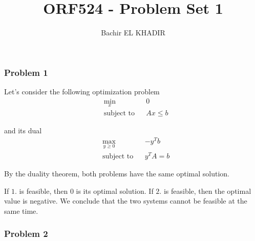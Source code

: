 \documentclass[12pt]{article}
\title{ORF524 - Problem Set 1}
\author{Bachir EL KHADIR }
\newcommand{\Q}[1]{\subsubsection*{Problem #1}}
\newcommand{\optimize}[4]{\begin{equation*}
\begin{aligned}
& \underset{#1}{\text{#4}}
& & #2 \\
& \text{subject to}
& & #3
\end{aligned}
\end{equation*}
}
\newcommand{\minimize}[3]{\optimize{#1}{#2}{#3}{min}}
\newcommand{\maximize}[3]{\optimize{#1}{#2}{#3}{max}}
\begin{document}
\maketitle

\Q{1}

Let's consider the following optimization problem
\minimize{x}{0}{Ax \leq b}
and its dual
\maximize{y \geq 0}{-y^T b}{y^TA = b}
By the duality theorem, both problems have the same optimal solution.

If $1.$ is feasible, then $0$ is its optimal solution. If $2.$ is feasible, then the optimal value is negative. We conclude that the two systems cannot be feasible at the same time.

\Q{2}
\end{document}
